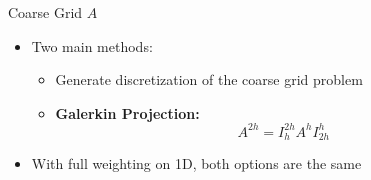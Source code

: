 \documentclass[11pt]{beamer}
\begin{document}
\begin{frame}{Coarse Grid $A$}
  \begin{itemize}
  \item Two main methods:
    \begin{itemize}
    \item Generate discretization of the coarse grid problem
    \item \textbf{Galerkin Projection: }\[
        A^{2h} = I_h^{2h} A^h I_{2h}^h
      \]
    \end{itemize}
  \item With full weighting on 1D, both options are the same
  \end{itemize}
\end{frame}
\end{document}

